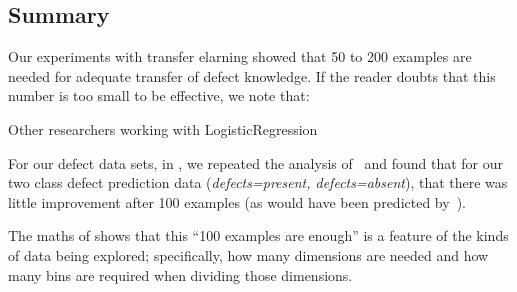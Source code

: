 \subsection{Summary}
Our experiments with transfer elarning showed that 50 to 200 examples are needed for adequate
transfer of defect knowledge. If the reader doubts that this number is too small to be effective,
we note that:
\bi
\item Other researchers working with LogisticRegression~\cite{peduzzi1996simulation}
\item For our defect data sets, in , we repeated the analysis of~\cite{peduzzi1996simulation}
and found that for our two class defect prediction data ({\em defects=present, defects=absent}),
that there was little improvement after 100 examples (as would have been predicted by~\cite{peduzzi1996simulation}).
\item The maths of  shows that this ``100 examples are enough'' is a feature of the kinds of
data being explored; specifically, how many dimensions are needed and how many bins are required when dividing
those dimensions.
\ei
